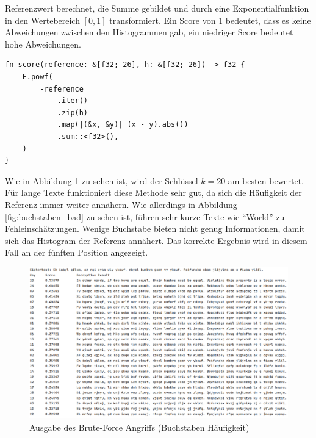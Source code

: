 \documentclass{article}
\begin{document}
    Referenzwert berechnet, die Summe gebildet und durch eine Exponentialfunktion
    in den Wertebereich $\left[0,1\right]$ transformiert. Ein Score von 1 bedeutet,
    dass es keine Abweichungen zwischen den Histogrammen gab, ein niedriger Score bedeutet
    hohe Abweichungen.
    \begin{verbatim}
fn score(reference: &[f32; 26], h: &[f32; 26]) -> f32 {
    E.powf(
        -reference
            .iter()
            .zip(h)
            .map(|(&x, &y)| (x - y).abs())
            .sum::<f32>(),
    )
}
    \end{verbatim}
    Wie in Abbildung \ref{fig:buchstaben_haufigkeit} zu sehen ist, wird der Schlüssel $k=20$ am besten bewertet.
    Für lange Texte funktioniert diese Methode sehr gut, da sich die Häufigkeit der Referenz immer weiter annähern.
    Wie allerdings in Abbildung \ref{fig:buchstaben_bad} zu sehen ist, führen sehr kurze Texte wie "`World"' zu 
    Fehleinschätzungen. Wenige Buchstabe bieten nicht genug Informationen, damit sich das Histogram der Referenz annähert.
    Das korrekte Ergebnis wird in diesem Fall an der fünften Position angezeigt.
    \begin{figure}[h!]
        \includegraphics[width=\textwidth]{text_results/console_out2.png}
        \caption{Ausgabe des Brute-Force Angriffs (Buchstaben Häufigkeit)}
        \label{fig:buchstaben_haufigkeit}
    \end{figure}
\end{document}
